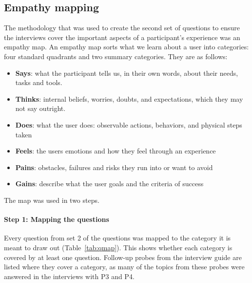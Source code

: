 \documentclass[12pt, titlepage]{article}
\begin{document}
\subsection{Empathy mapping}\label{sec:empathymethod}
The methodology that was used to create the second set of questions to ensure the interviews cover the important aspects of a participant's experience was an empathy map.
An empathy map sorts what we learn about a user into categories: four standard quadrants and two summary categories. They are as follows:

\begin{itemize}
    \item \textbf{Says}: what the participant tells us, in their own words, about their needs, tasks and tools.
    \item \textbf{Thinks}: internal beliefs, worries, doubts, and expectations, which they may not say outright.
    \item \textbf{Does}: what the user does: observable actions, behaviors, and physical steps taken
    \item \textbf{Feels}: the users emotions and how they feel through an experience
    \item \textbf{Pains}: obstacles, failures and risks they run into or want to avoid
    \item \textbf{Gains}: describe what the user goals and the criteria of success
\end{itemize}

\noindent The map was used in two steps.

\paragraph{Step 1: Mapping the questions} Every question from set 2 of the questions was mapped to the category it is meant to draw out (Table~\ref{tab:qmap}). 
This shows whether each category is covered by at least one question. Follow-up probes from the interview guide are listed where they cover a category, as many 
of the topics from these probes were answered in the interviews with P3 and P4. 
\end{document}
